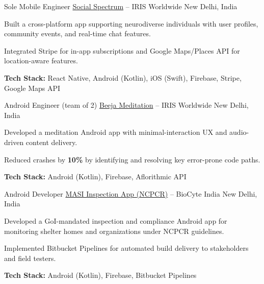 \begin{cventries}
  \cventry
    {Sole Mobile Engineer} %
    {\href{https://play.google.com/store/apps/details?id=com.social_spectrum.mobile&hl=en_IN}{Social Spectrum} -- IRIS Worldwide} %
    {New Delhi, India} %
    {} %
    {
      \begin{cvitems}
        \item {Built a cross-platform app supporting neurodiverse individuals with user profiles, community events, and real-time chat features.}
        \item {Integrated Stripe for in-app subscriptions and Google Maps/Places API for location-aware features.}
        \item {\textbf{Tech Stack:} React Native, Android (Kotlin), iOS (Swift), Firebase, Stripe, Google Maps API}
      \end{cvitems}
    }
\vspace{0.1cm}

  \cventry
    {Android Engineer (team of 2)} %
    {\href{https://play.google.com/store/apps/details?id=com.beejameditation.beeja}{Beeja Meditation} -- IRIS Worldwide} %
    {New Delhi, India} %
    {} %
    {
      \begin{cvitems}
        \item {Developed a meditation Android app with minimal-interaction UX and audio-driven content delivery.}
        \item {Reduced crashes by \textbf{10\%} by identifying and resolving key error-prone code paths.}
        \item {\textbf{Tech Stack:} Android (Kotlin), Firebase, Aflorithmic API}
      \end{cvitems}
    }
\vspace{0.1cm}

  \cventry
    {Android Developer} %
    {\href{https://play.google.com/store/apps/details?id=gov.ncpcr.masi}{MASI Inspection App (NCPCR)} -- BioCyte India} %
    {New Delhi, India} %
    {} %
    {
      \begin{cvitems}
        \item {Developed a GoI-mandated inspection and compliance Android app for monitoring shelter homes and organizations under NCPCR guidelines.}
        \item {Implemented Bitbucket Pipelines for automated build delivery to stakeholders and field testers.}
        \item {\textbf{Tech Stack:} Android (Kotlin), Firebase, Bitbucket Pipelines}
      \end{cvitems}
    }

\end{cventries}

